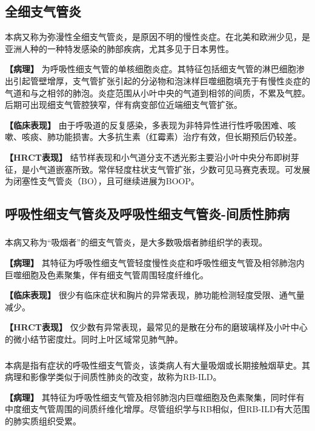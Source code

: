 \subsection{全细支气管炎}

本病又称为弥漫性全细支气管炎，是原因不明的慢性炎症。在北美和欧洲少见，是亚洲人种的一种特发感染的肺部疾病，尤其多见于日本男性。

\textbf{【病理】}
为呼吸性细支气管的单核细胞炎症。其特征包括细支气管的淋巴细胞渗出引起管壁增厚，支气管扩张引起的分泌物和泡沫样巨噬细胞填充于有慢性炎症的气道和与之相邻的肺泡。炎症范围从小叶中央的气道到相邻的间质，不累及气腔。后期可出现细支气管腔狭窄，伴有病变部位近端细支气管扩张。

\textbf{【临床表现】}
由于呼吸道的反复感染，多表现为非特异性进行性呼吸困难、咳嗽、咳痰、肺功能损害。大多抗生素（红霉素）治疗有效，但长期预后仍较差。

\textbf{【HRCT表现】}
结节样表现和小气道分支不透光影主要沿小叶中央分布即树芽征，是小气道嵌塞所致。常伴轻度柱状支气管扩张，少数可见马赛克表现。可发展为闭塞性支气管炎（BO），且可继续进展为BOOP。

\subsection{呼吸性细支气管炎及呼吸性细支气管炎-间质性肺病}

\subsubsection{}

本病又称为“吸烟者”的细支气管炎，是大多数吸烟者肺组织学的表现。

\textbf{【病理】}
其特征为呼吸性细支气管轻度慢性炎症和呼吸性细支气管及相邻肺泡内巨噬细胞及色素聚集，伴有细支气管周围轻度纤维化。

\textbf{【临床表现】}
很少有临床症状和胸片的异常表现，肺功能检测轻度受限、通气量减少。

\textbf{【HRCT表现】}
仅少数有异常表现，最常见的是散在分布的磨玻璃样及小叶中心的微小结节密度灶。同时上叶区域常见肺气肿。

\subsubsection{}

本病是指有症状的呼吸性细支气管炎，该类病人有大量吸烟或长期接触烟草史。其病理和影像学类似于间质性肺炎的改变，故称为RB-ILD。

\textbf{【病理】}
其特征为呼吸性细支气管及相邻肺泡内巨噬细胞及色素聚集，同时伴有中度细支气管周围的间质纤维化增厚。尽管组织学与RB相似，但RB-ILD有大范围的肺实质组织受累。

